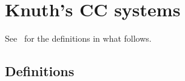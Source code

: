 %

\chapter{Knuth's CC systems}




See~\cite{knuth1992axioms} for the definitions in what follows.

\section{Definitions}


